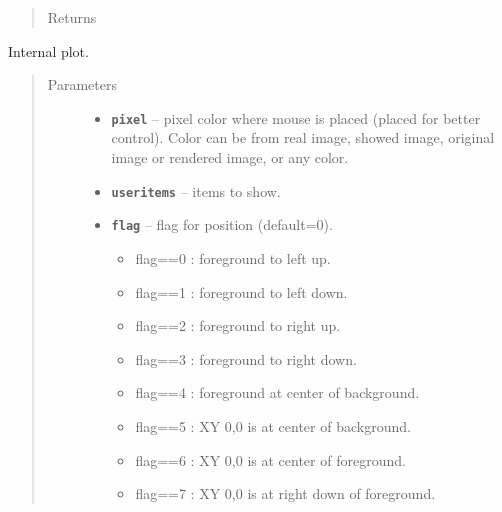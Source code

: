 \documentclass[letterpaper,10pt,english]{sphinxmanual}
\begin{document}
\begin{fulllineitems}
\begin{fulllineitems}
\begin{quote}
\begin{description}
\item[{Returns}] \leavevmode


\end{description}\end{quote}

\end{fulllineitems}


\begin{fulllineitems}
\label{RRtoolbox.lib:RRtoolbox.lib.plotter.plotim.builtinplot}
Internal plot.
\begin{quote}\begin{description}
\item[{Parameters}] \leavevmode\begin{itemize}
\item {} 
\textbf{\texttt{pixel}} -- pixel color where mouse is placed (placed for better control). Color can be from
real image, showed image, original image or rendered image, or any color.

\item {} 
\textbf{\texttt{useritems}} -- items to show.

\item {} 
\textbf{\texttt{flag}} -- 
flag for position (default=0).
\begin{itemize}
\item {} 
flag==0 : foreground to left up.

\item {} 
flag==1 : foreground to left down.

\item {} 
flag==2 : foreground to right up.

\item {} 
flag==3 : foreground to right down.

\item {} 
flag==4 : foreground at center of background.

\item {} 
flag==5 : XY 0,0 is at center of background.

\item {} 
flag==6 : XY 0,0 is at center of foreground.

\item {} 
flag==7 : XY 0,0 is at right down of foreground.


\end{itemize}
\end{itemize}
\end{description}
\end{quote}
\end{fulllineitems}
\end{fulllineitems}
\end{document}
